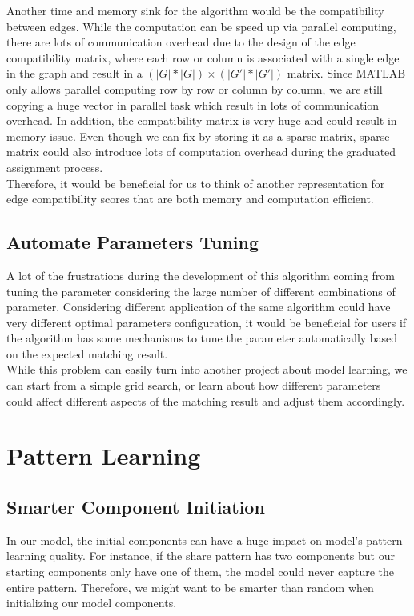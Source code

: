 Another time and memory sink for the algorithm would be the compatibility between edges. While the computation can be speed up via parallel computing, there are lots of communication overhead due to the design of the edge compatibility matrix, where each row or column is associated with a single edge in the graph and result in a $(|G|*|G|)\times(|G'|*|G'|)$ matrix. Since MATLAB only allows parallel computing row by row or column by column, we are still copying a huge vector in parallel task which result in lots of communication overhead. In addition, the compatibility matrix is very huge and could result in memory issue. Even though we can fix by storing it as a sparse matrix, sparse matrix could also introduce lots of computation overhead during the graduated assignment process.\\

Therefore, it would be beneficial for us to think of another representation for edge compatibility scores that are both memory and computation efficient.

\subsection{Automate Parameters Tuning}

A lot of the frustrations during the development of this algorithm coming from tuning the parameter considering the large number of different combinations of parameter. Considering different application of the same algorithm could have very different optimal parameters configuration, it would be beneficial for users if the algorithm has some mechanisms to tune the parameter automatically based on the expected matching result.\\

While this problem can easily turn into another project about model learning, we can start from a simple grid search, or learn about how different parameters could affect different aspects of the matching result and adjust them accordingly.


\section{Pattern Learning}

\subsection{Smarter Component Initiation}

In our model, the initial components can have a huge impact on model's pattern learning quality. For instance, if the share pattern has two components but our starting components only have one of them, the model could never capture the entire pattern. Therefore, we might want to be smarter than random when initializing our model components.\\

